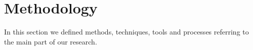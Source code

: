 \section{Methodology}
In this section we defined methods, techniques, tools and processes referring to the main part of our research.






